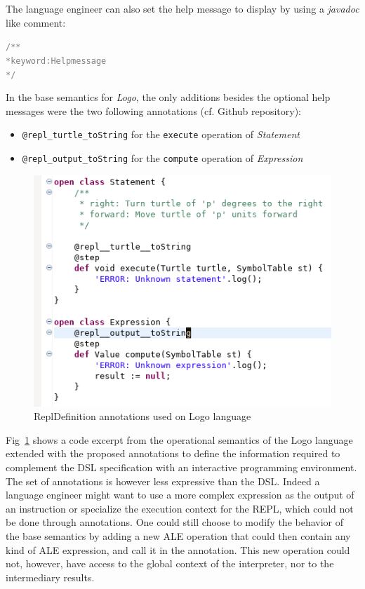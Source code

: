 The language engineer can also set the help message to display by using a \textit{javadoc} like comment:
\begin{alltt}
    \textcolor{gray}{/**
     * keyword: Help message
     */}
\end{alltt}

In the base semantics for \textit{Logo}, the only additions besides the optional help messages were the two following annotations (cf. Github repository):
\begin{itemize}
    \item \verb|@repl_turtle_toString| for the \verb|execute| operation of \textit{Statement}
    \item \verb|@repl_output_toString| for the \verb|compute| operation of \textit{Expression}
\end{itemize}


\begin{figure}[t]
	\centering
	\includegraphics[width=\linewidth]{figures/annotations.png}
	\caption{ReplDefinition annotations used on Logo language}
	\label{fig:ReplDefinitionAnnotation}
\end{figure}

Fig~\ref{fig:ReplDefinitionAnnotation} shows a code excerpt from the operational semantics of the Logo language extended with the proposed annotations to define the information required to complement the DSL specification with an interactive programming environment. The set of annotations is however less expressive than the DSL. Indeed a language engineer might want to use a more complex expression as the output of an instruction or specialize the execution context for the REPL, which could not be done through annotations.
One could still choose to modify the behavior of the base semantics by adding a new ALE operation that could then contain any kind of ALE expression, and call it in the annotation.
This new operation could not, however, have access to the global context of the interpreter, nor to the intermediary results.

